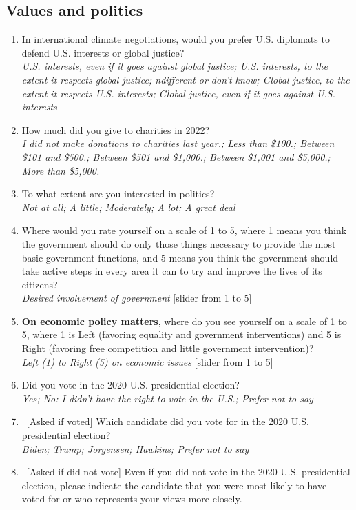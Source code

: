 \subsection*{Values and politics}
\begin{enumerate}[resume] \item In international climate negotiations, would you prefer U.S. diplomats to defend U.S. interests or global justice?
\\ \textit{U.S. interests, even if it goes against global justice; U.S. interests, to the extent it respects global justice; ndifferent or don't know; Global justice, to the extent it respects U.S. interests; Global justice, even if it goes against U.S. interests}
\item How much did you give to charities in 2022?
\\ \textit{I did not make donations to charities last year.; Less than \$100.; Between \$101 and \$500.; Between \$501 and \$1,000.; Between \$1,001 and \$5,000.; More than \$5,000.}
\item To what extent are you interested in politics?
\\ \textit{Not at all; A little; Moderately; A lot; A great deal}
\item Where would you rate yourself on a scale of 1 to 5, where 1 means you think the government should do only those things necessary to provide the most basic government functions, and 5 means you think the government should take active steps in every area it can to try and improve the lives of its citizens?
\\ \textit{Desired involvement of government} [slider from 1 to 5]
\item \textbf{On economic policy matters}, where do you see yourself on a scale of 1 to 5, where 1 is Left (favoring equality and government interventions) and 5 is Right (favoring free competition and little government intervention)?
\\ \textit{Left (1) to Right (5) on economic issues} [slider from 1 to 5]
\item Did you vote in the 2020 U.S. presidential election? \label{item:election}
\\ \textit{Yes; No: I didn't have the right to vote in the U.S.; Prefer not to say}
\item ~[Asked if voted] Which candidate did you vote for in the 2020 U.S. presidential election?
\\ \textit{Biden; Trump; Jorgensen; Hawkins; Prefer not to say}
\item ~[Asked if did not vote] Even if you did not vote in the 2020 U.S. presidential election, please indicate the candidate that you were most likely to have voted for or who represents your views more closely.

\end{enumerate}
